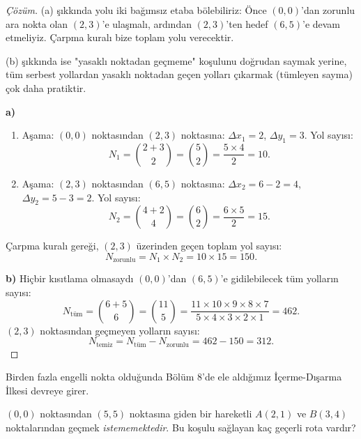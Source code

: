 \begin{proof}[Çözüm]
(a) şıkkında yolu iki bağımsız etaba bölebiliriz: Önce $(0,0)$'dan zorunlu ara nokta olan $(2,3)$'e ulaşmalı, ardından $(2,3)$'ten hedef $(6,5)$'e devam etmeliyiz. Çarpma kuralı bize toplam yolu verecektir.

(b) şıkkında ise "yasaklı noktadan geçmeme" koşulunu doğrudan saymak yerine, tüm serbest yollardan yasaklı noktadan geçen yolları çıkarmak (tümleyen sayma) çok daha pratiktir.

\textbf{a)} 
\begin{enumerate}
    \item Aşama: $(0,0)$ noktasından $(2,3)$ noktasına:
$\Delta x_1 = 2$, $\Delta y_1 = 3$. Yol sayısı:
\[
N_1 = \binom{2+3}{2} = \binom{5}{2} = \frac{5 \times 4}{2} = 10.
\]
\item Aşama: $(2,3)$ noktasından $(6,5)$ noktasına:
$\Delta x_2 = 6 - 2 = 4$, $\Delta y_2 = 5 - 3 = 2$. Yol sayısı:
\[
N_2 = \binom{4+2}{4} = \binom{6}{2} = \frac{6 \times 5}{2} = 15.
\]
\end{enumerate}
Çarpma kuralı gereği, $(2,3)$ üzerinden geçen toplam yol sayısı:
\[
N_{\text{zorunlu}} = N_1 \times N_2 = 10 \times 15 = 150.
\]

\textbf{b)} 
Hiçbir kısıtlama olmasaydı $(0,0)$'dan $(6,5)$'e gidilebilecek tüm yolların sayısı:
\[
N_{\text{tüm}} = \binom{6+5}{6} = \binom{11}{5} = \frac{11 \times 10 \times 9 \times 8 \times 7}{5 \times 4 \times 3 \times 2 \times 1} = 462.
\]
$(2,3)$ noktasından geçmeyen yolların sayısı:
\[
N_{\text{temiz}} = N_{\text{tüm}} - N_{\text{zorunlu}} = 462 - 150 = 312.
\]
\end{proof}

Birden fazla engelli nokta olduğunda Bölüm 8'de ele aldığımız İçerme-Dışarma İlkesi devreye girer.

\begin{example}
$(0,0)$ noktasından $(5,5)$ noktasına giden bir hareketli $A(2,1)$ ve $B(3,4)$ noktalarından geçmek \emph{istememektedir}. Bu koşulu sağlayan kaç geçerli rota vardır?
\end{example}

